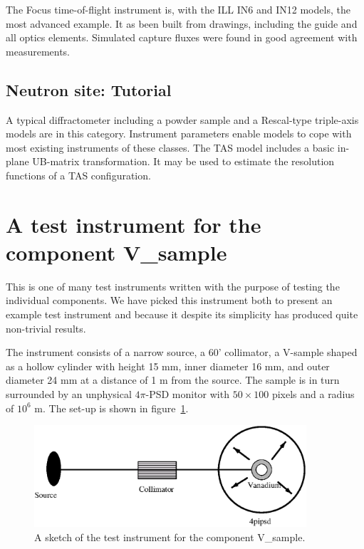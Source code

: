 The Focus time-of-flight instrument is, with the ILL IN6 and IN12 models, the most advanced example. It as been built from drawings, including the guide and all optics elements. Simulated capture fluxes were found in good agreement with measurements.

\subsection{Neutron site: Tutorial}

A typical diffractometer including a powder sample and a Rescal-type triple-axis models are in this category. Instrument parameters enable models to cope with most existing instruments of these classes. The TAS model includes a basic in-plane UB-matrix transformation. It may be used to estimate the resolution functions of a TAS configuration.

\section{A test instrument for the component V\_sample}
\label{s:V-instr}
This is one of many test instruments written with the
purpose of testing the individual components. We have picked 
this instrument both to present an
example test instrument and because it despite its simplicity
has produced quite non-trivial results.

The instrument consists of a narrow source, 
a 60' collimator, a V-sample shaped as a hollow cylinder
with height 15 mm, inner diameter 16 mm, and outer diameter 24 mm
at a distance of 1 m from the source. 
The sample is in turn surrounded by an unphysical $4\pi$-PSD
monitor with $50 \times 100$ pixels and a radius of $10^{6}$ m. 
The set-up is shown in figure~\ref{f:V-instr}.

\begin{figure}
  \begin{center}
    \includegraphics[width=0.9\textwidth]{figures/vanadium.eps}
  \end{center}
\caption{A sketch of the test instrument for the component
V\_sample.}
\label{f:V-instr}
\end{figure}

